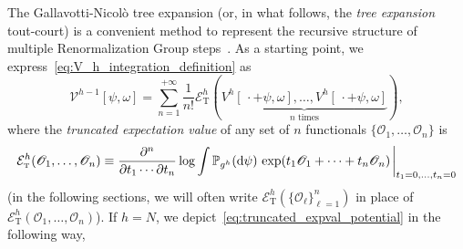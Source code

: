 \documentclass[a4paper, 11pt]{article}
\newcommand{\dgauss}[2]{\mathbb{P}_{#1}(\dd #2)}			%
\newcommand{\sing}[2]{{#1}^{#2}}							%
\newcommand{\TExp}[1]{\mathcal{E}^{#1}_%
{\scriptscriptstyle{\mathrm{T}}}}							%
\newcommand{\src}{\omega}									%
\theoremstyle{thm}
\begin{document}
The Gallavotti-Nicolò tree expansion (or, in what follows, the \emph{tree expansion} tout-court) is a convenient method to represent the recursive structure of multiple Renormalization Group steps~\cite{Gallavotti_1995, Mastropietro_Nonpert_Renorm, Gentile_2001}. As a starting point, we express~\eqref{eq:V_h_integration_definition} as
\begin{equation}
\label{eq:truncated_expval_potential}
\sing{\mathscr{V}}{h-1}[\psi, \src] = \sum_{n = 1}^{+\infty} \frac{1}{n!} \TExp{h}(\underbrace{\sing{V}{h}[\, \cdot + \psi, \omega], \dots, \sing{V}{h}[\, \cdot + \psi, \omega]}_{n \text{ times}}),
\end{equation}
where the \emph{truncated expectation value} of any set of $n$ functionals $\lbrace \mathscr{O}_1, \dots, \mathscr{O}_n \rbrace$ is
\begin{equation}
\TExp{h}(\mathscr{O}_1, \dots, \mathscr{O}_n) \equiv \frac{\partial^n}{\partial t_1 \cdots \partial t_n} \log \int \dgauss{\sing{g}{h}}{\psi} \, \exp(t_1 \mathscr{O}_1 + \cdots + t_n \mathscr{O}_n) \eval_{t_1 = 0, \dots, t_n = 0}
\end{equation}
(in the following sections, we will often write $\TExp{h}(\lbrace \mathscr{O}_\ell \rbrace_{\ell=1}^n)$ in place of $\TExp{h}(\mathscr{O}_1, \dots, \mathscr{O}_n)$). If $h = N$, we depict~\eqref{eq:truncated_expval_potential} in the following way,
\end{document}
